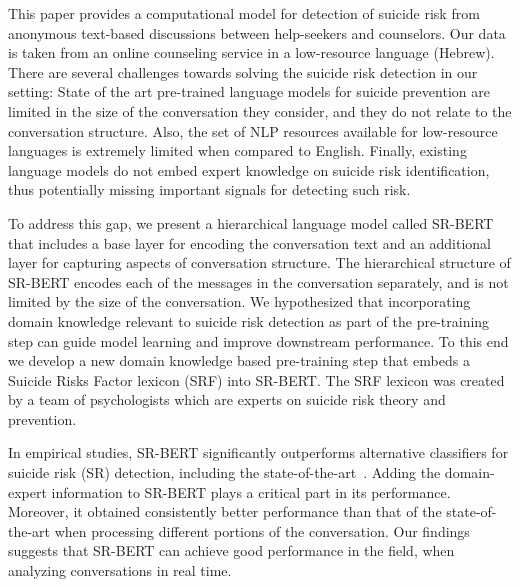 \documentclass[letterpaper]{article} %
\newcommand{\kibitz}[2]{\ifnum\Comments=1{\textcolor{#1}{#2}}\fi}
\newcommand{\kg}[1]{\kibitz{red}{[KG:#1]}}
\begin{document}
 This paper provides a  computational model for detection of suicide risk from anonymous text-based discussions between help-seekers and counselors.  Our data is taken from an online counseling service in a low-resource language (Hebrew). There are several challenges towards solving the suicide risk detection in our setting:
 State of the art pre-trained language models for suicide prevention  are limited in the size of the conversation they consider, and they  do not relate to the conversation structure.  
 Also, the set of NLP resources available for low-resource languages is extremely limited when compared to English. Finally, existing language models do not embed expert knowledge on suicide risk identification, thus potentially missing important signals for detecting such risk. 
 
To address this gap, we present a hierarchical language model called SR-BERT that includes a base layer for encoding the conversation text and an additional layer for capturing aspects of conversation structure. 
The hierarchical structure of SR-BERT  encodes  each of the messages in the conversation separately, and is not limited by the size of the conversation.  
 We hypothesized that incorporating domain knowledge relevant to suicide risk detection as part of the pre-training step can guide model learning and improve downstream performance. To this end we develop a new domain knowledge based pre-training step that embeds a Suicide Risks Factor lexicon (SRF) into SR-BERT. The SRF lexicon was created by a team of psychologists which are experts on suicide risk theory and prevention. 


 
 
In empirical studies, SR-BERT significantly outperforms alternative classifiers for suicide risk (SR) detection, including the state-of-the-art~\cite{amir}. Adding the domain-expert information to SR-BERT plays a critical part in its performance.  Moreover, it obtained consistently better performance  than that of the state-of-the-art when processing different portions of the conversation. 
Our findings suggests that SR-BERT can achieve good performance in the field, when analyzing conversations in real time.
\end{document}
